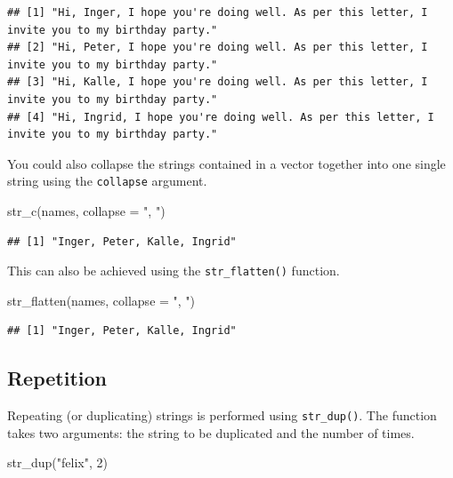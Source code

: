 \documentclass[
]{book}
\newenvironment{Shaded}{\begin{snugshade}}{\end{snugshade}}
\newcommand{\AttributeTok}[1]{\textcolor[rgb]{0.77,0.63,0.00}{#1}}
\newcommand{\DecValTok}[1]{\textcolor[rgb]{0.00,0.00,0.81}{#1}}
\newcommand{\FunctionTok}[1]{\textcolor[rgb]{0.00,0.00,0.00}{#1}}
\newcommand{\NormalTok}[1]{#1}
\newcommand{\StringTok}[1]{\textcolor[rgb]{0.31,0.60,0.02}{#1}}
\begin{document}
\begin{verbatim}
## [1] "Hi, Inger, I hope you're doing well. As per this letter, I invite you to my birthday party." 
## [2] "Hi, Peter, I hope you're doing well. As per this letter, I invite you to my birthday party." 
## [3] "Hi, Kalle, I hope you're doing well. As per this letter, I invite you to my birthday party." 
## [4] "Hi, Ingrid, I hope you're doing well. As per this letter, I invite you to my birthday party."
\end{verbatim}

You could also collapse the strings contained in a vector together into one single string using the \texttt{collapse} argument.

\begin{Shaded}
\begin{Highlighting}[]
\FunctionTok{str\_c}\NormalTok{(names, }\AttributeTok{collapse =} \StringTok{", "}\NormalTok{)}
\end{Highlighting}
\end{Shaded}

\begin{verbatim}
## [1] "Inger, Peter, Kalle, Ingrid"
\end{verbatim}

This can also be achieved using the \texttt{str\_flatten()} function.

\begin{Shaded}
\begin{Highlighting}[]
\FunctionTok{str\_flatten}\NormalTok{(names, }\AttributeTok{collapse =} \StringTok{", "}\NormalTok{)}
\end{Highlighting}
\end{Shaded}

\begin{verbatim}
## [1] "Inger, Peter, Kalle, Ingrid"
\end{verbatim}

\hypertarget{repetition}{%
\subsection{Repetition}\label{repetition}}

Repeating (or duplicating) strings is performed using \texttt{str\_dup()}. The function takes two arguments: the string to be duplicated and the number of times.

\begin{Shaded}
\begin{Highlighting}[]
\FunctionTok{str\_dup}\NormalTok{(}\StringTok{"felix"}\NormalTok{, }\DecValTok{2}\NormalTok{)}
\end{Highlighting}
\end{Shaded}
\end{document}
